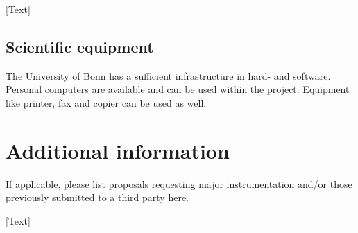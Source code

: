 \documentclass[a4paper,12pt]{article}
\begin{document}
[Text]

\subsection{Scientific equipment}
The University of Bonn has a sufficient infrastructure in hard- and software. Personal computers are available and can be used within the project. Equipment like printer, fax and copier can be used as well.







\section{Additional information}
If applicable, please list proposals requesting major instrumentation and/or those previously submitted to a third party here.

[Text]
\end{document}
